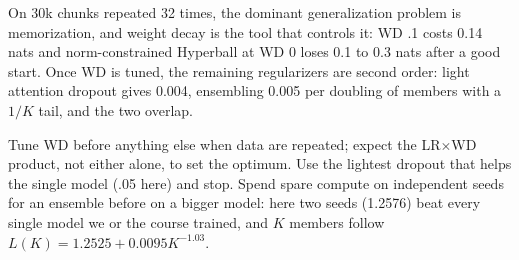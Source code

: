  On 30k chunks repeated 32 times, the dominant generalization problem is memorization, and weight decay is the tool that controls it: WD .1 costs 0.14 nats and norm-constrained Hyperball at WD 0 loses 0.1 to 0.3 nats after a good start. Once WD is tuned, the remaining regularizers are second order: light attention dropout gives 0.004, ensembling 0.005 per doubling of members with a $1/K$ tail, and the two overlap.

 Tune WD before anything else when data are repeated; expect the LR$\times$WD product, not either alone, to set the optimum. Use the lightest dropout that helps the single model (.05 here) and stop. Spend spare compute on independent seeds for an ensemble before on a bigger model: here two seeds (1.2576) beat every single model we or the course trained, and $K$ members follow $L(K)=1.2525+0.0095K^{-1.03}$.
